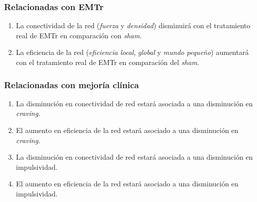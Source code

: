     \subsubsection{Relacionadas con EMTr}
    \begin{enumerate}[resume,label=Hipótesis \arabic*., left= \parindent]
        \item La conectividad de la red (\emph{fuerza} y \emph{densidad}) disminuirá con el tratamiento real de EMTr en comparación con \textit{sham}.
        \item La eficiencia de la red (\emph{eficiencia local}, \emph{global} y \emph{mundo pequeño}) aumentará con el tratamiento real de EMTr en comparación del \textit{sham}.
    \end{enumerate}
    \subsubsection{Relacionadas con mejoría clínica}
    \begin{enumerate}[resume,label=Hipótesis \arabic*., left= \parindent]
        \item La disminución en conectividad de red estará asociada a una disminución en \textit{craving}.
        \item El aumento en eficiencia de la red estará asociado a una disminución en \textit{craving}.
        \item La disminución en conectividad de red estará asociada a una disminución en impulsividad.
        \item El aumento en eficiencia de la red estará asociado a una disminución en impulsividad.
    \end{enumerate}

